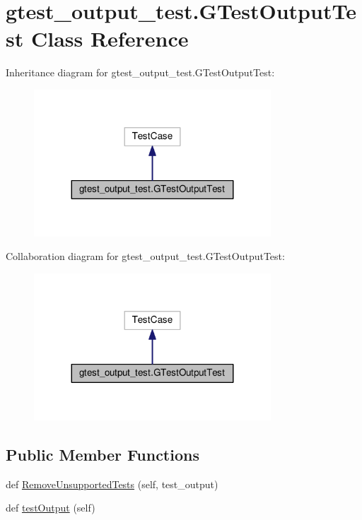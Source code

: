\hypertarget{classgtest__output__test_1_1GTestOutputTest}{}\section{gtest\+\_\+output\+\_\+test.\+G\+Test\+Output\+Test Class Reference}
\label{classgtest__output__test_1_1GTestOutputTest}


Inheritance diagram for gtest\+\_\+output\+\_\+test.\+G\+Test\+Output\+Test\+:
\nopagebreak
\begin{figure}[H]
\begin{center}
\leavevmode
\includegraphics[width=251pt]{classgtest__output__test_1_1GTestOutputTest__inherit__graph}
\end{center}
\end{figure}


Collaboration diagram for gtest\+\_\+output\+\_\+test.\+G\+Test\+Output\+Test\+:
\nopagebreak
\begin{figure}[H]
\begin{center}
\leavevmode
\includegraphics[width=251pt]{classgtest__output__test_1_1GTestOutputTest__coll__graph}
\end{center}
\end{figure}
\subsection*{Public Member Functions}
\begin{DoxyCompactItemize}
\item 
def \hyperlink{classgtest__output__test_1_1GTestOutputTest_a63f62268f795adfc5ca91514dbec2873}{Remove\+Unsupported\+Tests} (self, test\+\_\+output)
\item 
def \hyperlink{classgtest__output__test_1_1GTestOutputTest_a1e6b96f68c5bcb8271de3208fa7f9f64}{test\+Output} (self)
\end{DoxyCompactItemize}


